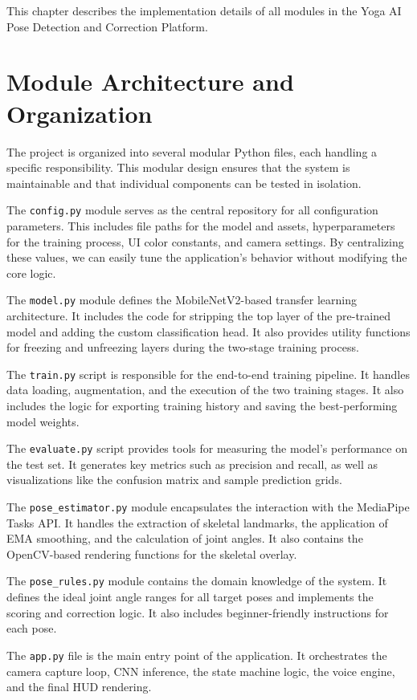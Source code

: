 
This chapter describes the implementation details of all modules in the Yoga AI Pose Detection and Correction Platform.

\section{Module Architecture and Organization}
The project is organized into several modular Python files, each handling a specific responsibility. This modular design ensures that the system is maintainable and that individual components can be tested in isolation.

The \texttt{config.py} module serves as the central repository for all configuration parameters. This includes file paths for the model and assets, hyperparameters for the training process, UI color constants, and camera settings. By centralizing these values, we can easily tune the application's behavior without modifying the core logic.

The \texttt{model.py} module defines the MobileNetV2-based transfer learning architecture. It includes the code for stripping the top layer of the pre-trained model and adding the custom classification head. It also provides utility functions for freezing and unfreezing layers during the two-stage training process.

The \texttt{train.py} script is responsible for the end-to-end training pipeline. It handles data loading, augmentation, and the execution of the two training stages. It also includes the logic for exporting training history and saving the best-performing model weights.

The \texttt{evaluate.py} script provides tools for measuring the model's performance on the test set. It generates key metrics such as precision and recall, as well as visualizations like the confusion matrix and sample prediction grids.

The \texttt{pose\_estimator.py} module encapsulates the interaction with the MediaPipe Tasks API. It handles the extraction of skeletal landmarks, the application of EMA smoothing, and the calculation of joint angles. It also contains the OpenCV-based rendering functions for the skeletal overlay.

The \texttt{pose\_rules.py} module contains the domain knowledge of the system. It defines the ideal joint angle ranges for all target poses and implements the scoring and correction logic. It also includes beginner-friendly instructions for each pose.

The \texttt{app.py} file is the main entry point of the application. It orchestrates the camera capture loop, CNN inference, the state machine logic, the voice engine, and the final HUD rendering.

